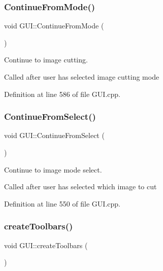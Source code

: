 \mbox{\label{classGUI_a3547730e0fae81b59fcb19d00a370782}} 
\subsubsection{\texorpdfstring{Continue\+From\+Mode()}{ContinueFromMode()}}
{\footnotesize\ttfamily void G\+U\+I\+::\+Continue\+From\+Mode (\begin{DoxyParamCaption}{ }\end{DoxyParamCaption})}



Continue to image cutting. 

Called after user has selected image cutting mode 

Definition at line 586 of file G\+U\+I.\+cpp.

\mbox{\label{classGUI_a0cddf3859f457495040857f4868f32e3}} 
\subsubsection{\texorpdfstring{Continue\+From\+Select()}{ContinueFromSelect()}}
{\footnotesize\ttfamily void G\+U\+I\+::\+Continue\+From\+Select (\begin{DoxyParamCaption}{ }\end{DoxyParamCaption})}



Continue to image mode select. 

Called after user has selected which image to cut 

Definition at line 550 of file G\+U\+I.\+cpp.

\mbox{\label{classGUI_a26cdc4a989f3637301f0afb9cc5e23b0}} 
\subsubsection{\texorpdfstring{create\+Toolbars()}{createToolbars()}}
{\footnotesize\ttfamily void G\+U\+I\+::create\+Toolbars (\begin{DoxyParamCaption}{ }\end{DoxyParamCaption})}



